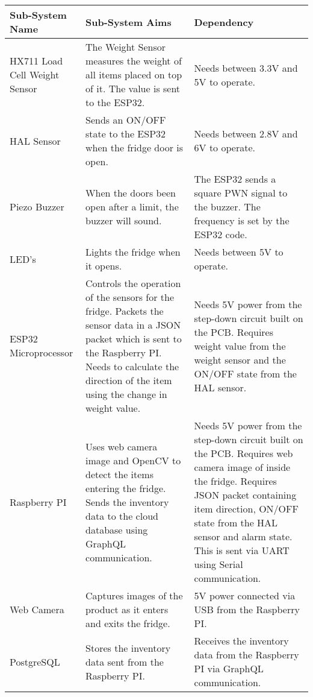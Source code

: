 \begin{longtable}[c]{lll}
    \caption{}
    \label{tab:my-table}\\
    Sub-System Name &
      Sub-System Aims &
      Dependency \\
    \endfirsthead
    \endhead
    HX711 Load Cell Weight Sensor &
      The Weight Sensor measures the weight of all items placed on top of it. The value is sent to the ESP32. &
      Needs between 3.3V and 5V to operate. \\
    HAL Sensor &
      Sends an ON/OFF state to the ESP32 when the fridge door is open. &
      Needs between 2.8V and 6V to operate. \\
    Piezo Buzzer &
      When the doors been open after a limit, the buzzer will sound. &
      The ESP32 sends a square PWN signal to the buzzer. The frequency is set by the ESP32 code. \\
    LED’s &
      Lights the fridge when it opens. &
      Needs between 5V to operate. \\
    ESP32 Microprocessor &
      Controls the operation of the sensors for the fridge. Packets the sensor data in a JSON packet which is sent to the Raspberry PI. Needs to calculate the direction of the item using the change in weight value. &
      Needs 5V power from the step-down circuit built on the PCB. Requires weight value from the weight sensor and the ON/OFF state from the HAL sensor. \\
    Raspberry PI &
      Uses web camera image and OpenCV to detect the items entering the fridge. Sends the inventory data to the cloud database using GraphQL communication. &
      Needs 5V power from the step-down circuit built on the PCB. Requires web camera image of inside the fridge. Requires JSON packet containing item direction, ON/OFF state from the HAL sensor and alarm state. This is sent via UART using Serial communication. \\
    Web Camera &
      Captures images of the product as it enters and exits the fridge. &
      5V power connected via USB from the Raspberry PI. \\
    PostgreSQL &
      Stores the inventory data sent from the Raspberry PI. &
      Receives the inventory data from the Raspberry PI via GraphQL communication.
    \end{longtable}